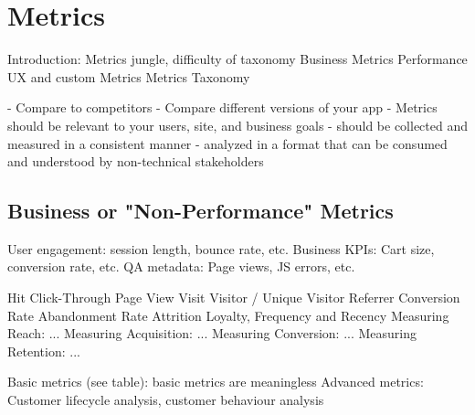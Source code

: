 \section{Metrics}


Introduction: Metrics jungle, difficulty of taxonomy
Business Metrics
Performance UX and custom Metrics
Metrics Taxonomy



- Compare to competitors
- Compare different versions of your app
- Metrics should be relevant to your users, site, and business goals
- should be collected and measured in a consistent manner
- analyzed in a format that can be consumed and understood by non-technical stakeholders














\subsection{Business or "Non-Performance" Metrics}


User engagement: session length, bounce rate, etc.
Business KPIs: Cart size, conversion rate, etc.
QA metadata: Page views, JS errors, etc.



Hit
Click-Through
 Page View
 Visit
 Visitor / Unique Visitor
 Referrer
 Conversion Rate
 Abandonment Rate
 Attrition
 Loyalty, Frequency and Recency
 Measuring Reach: ...
 Measuring Acquisition: ...
 Measuring Conversion: ...
 Measuring Retention: ...


 Basic metrics (see table): basic metrics are meaningless
 Advanced metrics: Customer lifecycle analysis, customer behaviour analysis



